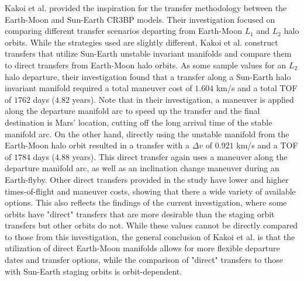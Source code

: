 Kakoi et al. provided the inspiration for the transfer methodology between the Earth-Moon and
Sun-Earth CR3BP models\cite{Kakoi:2014,Kakoi:2015}. Their investigation focused on comparing
different transfer scenarios departing from Earth-Moon $L_{1}$ and $L_{2}$ halo orbits. While the
strategies used are slightly different, Kakoi et al. construct transfers that utilize Sun-Earth
unstable invariant manifolds and compare them to direct transfers from Earth-Moon halo orbits. As
some sample values for an $L_{2}$ halo departure, their investigation found that a transfer along a
Sun-Earth halo invariant manifold required a total maneuver cost of $1.604$ km/s and a total TOF of
$1762$ days ($4.82$ years). Note that in their investigation, a maneuver is applied along the
departure manifold arc to speed up the transfer and the final destination is Mars' location,
cutting off the long arrival time of the stable manifold arc. On the other hand, directly using the
unstable manifold from the Earth-Moon halo orbit resulted in a transfer with a $\Delta v$ of
$0.921$ km/s and a TOF of $1784$ days ($4.88$ years)\cite{Kakoi:2015}. This direct transfer again
uses a maneuver along the departure manifold arc, as well as an inclination change maneuver during
an Earth-flyby. Other direct transfers provided in the study have lower and higher times-of-flight
and maneuver costs, showing that there a wide variety of available options. This also reflects the
findings of the current investigation, where some orbits have "direct" transfers that are more
desirable than the staging orbit transfers but other orbits do not. While these values cannot be
directly compared to those from this investigation, the general conclusion of Kakoi et al. is that
the utilization of direct Earth-Moon manifolds allows for more flexible departure dates and
transfer options, while the comparison of "direct" transfers to those with Sun-Earth staging orbits
is orbit-dependent.

